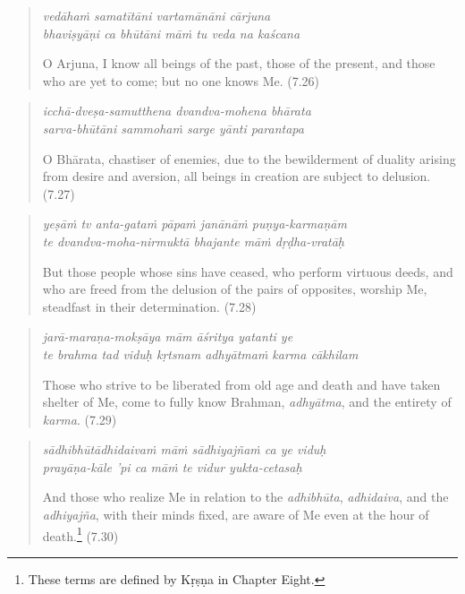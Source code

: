 \documentclass[12pt, twoside, openright]{memoir}
\begin{document}
\par
\begin{verse}
\textit{vedāhaṁ samatītāni vartamānāni cārjuna} \\
\textit{bhaviṣyāṇi ca bhūtāni māṁ tu veda na kaścana}

\noindent O Arjuna, I know all beings of the past, those of the present, and those who are yet to come; but no one knows Me. (7.26)
\end{verse}
\par



\par
\begin{verse}
\textit{icchā-dveṣa-samutthena dvandva-mohena bhārata} \\
\textit{sarva-bhūtāni sammohaṁ sarge yānti parantapa}

\noindent O Bhārata, chastiser of enemies, due to the bewilderment of duality arising from desire and aversion, all beings in creation are subject to delusion. (7.27)
\end{verse}
\par



\par
\begin{verse}
\textit{yeṣāṁ tv anta-gataṁ pāpaṁ janānāṁ puṇya-karmaṇām} \\
\textit{te dvandva-moha-nirmuktā bhajante māṁ dṛḍha-vratāḥ}

\noindent But those people whose sins have ceased, who perform virtuous deeds, and who are freed from the delusion of the pairs of opposites, worship Me, steadfast in their determination. (7.28)
\end{verse}
\par



\par
\begin{verse}
\textit{jarā-maraṇa-mokṣāya mām āśritya yatanti ye} \\
\textit{te brahma tad viduḥ kṛtsnam adhyātmaṁ karma cākhilam}

\noindent Those who strive to be liberated from old age and death and have taken shelter of Me, come to fully know Brahman, \textit{adhyātma}, and the entirety of \textit{karma}. (7.29)
\end{verse}
\par



\par
\begin{verse}
\textit{sādhibhūtādhidaivaṁ māṁ sādhiyajñaṁ ca ye viduḥ} \\
\textit{prayāṇa-kāle ’pi ca māṁ te vidur yukta-cetasaḥ}

\noindent And those who realize Me in relation to the \textit{adhibhūta}, \textit{adhidaiva}, and the \textit{adhiyajña}, with their minds fixed, are aware of Me even at the hour of death.\footnote{These terms are defined by Kṛṣṇa in Chapter Eight.} (7.30)
\end{verse}
\par
\end{document}
